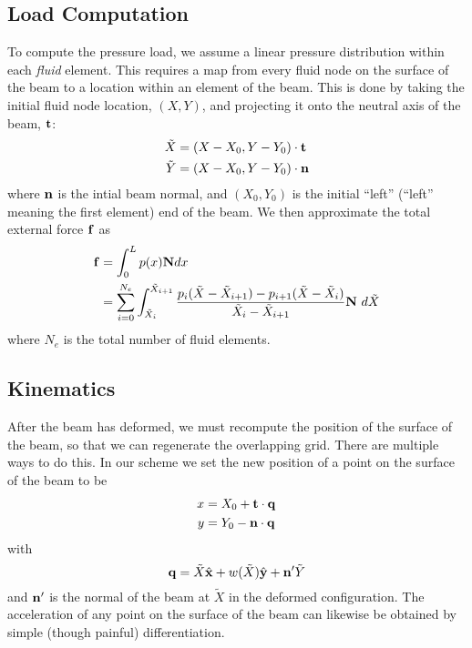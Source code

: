 \documentclass{article}
\begin{document}
\subsection{Load Computation}
To compute the pressure load, we assume a linear pressure distribution within each \emph{fluid} element.
This requires a map from every fluid node on the surface of the beam to a location within an element of the beam.
This is done by taking the initial fluid node location, $(X, Y)$, and projecting it onto the neutral axis of the beam, ${\bf t}$:
\begin{equation} \begin{aligned}
\tilde{X} &= (X-X_0,Y-Y_0)\cdot {\bf t} \\
\tilde{Y} &= (X-X_0,Y-Y_0)\cdot {\bf n} 
\end{aligned}
\label{eq:eq5300}
\end{equation}
where ${\bf n}$ is the intial beam normal, and $(X_0, Y_0)$ is the initial ``left'' (``left'' meaning the first element) end of the beam.
We then approximate the total external force ${\bf f}$ as
\begin{equation} \begin{aligned}
{\bf f}&=\int_0^{L} p(x) {\bf N} dx \\
       &= \sum_{i=0}^{N_e} \int_{\tilde{X}_i}^{\tilde{X}_{i+1}} \frac{p_i(\tilde{X}-\tilde{X}_{i+1})-p_{i+1}(\tilde{X}-\tilde{X}_{i})}{\tilde{X}_i-\tilde{X}_{i+1}} {\bf N} \ d\tilde{X}
\end{aligned} \label{eq:eq5400} \end{equation}
where $N_e$ is the total number of fluid elements.

\subsection{Kinematics}  
After the beam has deformed, we must recompute the position of the surface of the beam, so that we can regenerate the overlapping grid.
There are multiple ways to do this.  
In our scheme we set the new position of a point on the surface of the beam to be
\begin{equation} \begin{aligned}
 x &= X_0 + {\bf t} \cdot {\bf q} \\
 y &= Y_0 - {\bf n} \cdot {\bf q}
\end{aligned} \label{eq:eq5500} \end{equation}
with 
\begin{equation} {\bf q} = \tilde{X}\hat{\bf x} + w(\tilde{X})\hat{\bf y}+ {\bf n}' \tilde{Y} \label{eq:eq5600} \end{equation}
and ${\bf n}'$ is the normal of the beam at $\tilde{X}$ in the deformed configuration.
The acceleration of any point on the surface of the beam can likewise be obtained by simple (though painful) differentiation.
\end{document}

